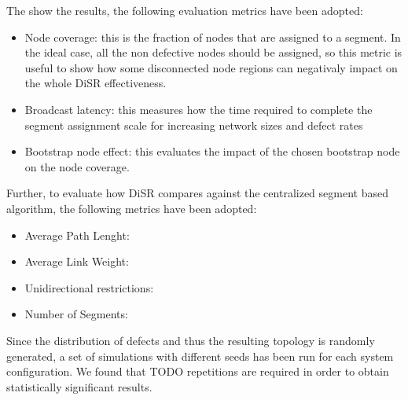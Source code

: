 The show the results, the following evaluation metrics have been adopted:
\begin{itemize}
\item{Node coverage}: this is the fraction of nodes that
are assigned to a segment. In the ideal case, all the non defective
nodes should be assigned, so this metric is useful to show how some
disconnected node regions can negativaly impact on the whole DiSR
effectiveness.
\item{Broadcast latency}: this measures how the time required to complete the
segment assignment scale for increasing network sizes and defect rates
\item{Bootstrap node effect}: this evaluates the impact of the chosen
bootstrap node on the node coverage.
\end{itemize}

Further, to evaluate how DiSR compares against the centralized segment
based algorithm, the following metrics have been adopted:
\begin{itemize}
\item {Average Path Lenght}:
\item {Average Link Weight}:
\item {Unidirectional restrictions:}
\item {Number of Segments}:
\end{itemize}

Since the distribution of defects and thus the resulting topology is randomly
generated, a set of simulations with different seeds has been run
for each system configuration. We found that TODO repetitions are
required in order to obtain statistically significant results.

